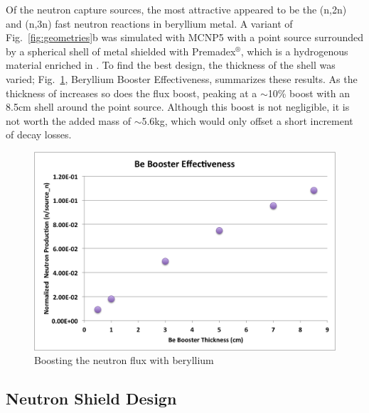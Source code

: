 \documentclass{mc2015}
\begin{document}
Of the neutron capture sources, the most attractive appeared to be the (n,2n) and (n,3n) fast neutron reactions in beryllium metal. A variant of Fig.\ \ref{fig:geometries}b was simulated with MCNP5 with a  point source surrounded by a spherical shell of  metal shielded with Premadex$^\circledR$, which is a hydrogenous material enriched in  \cite{prem}.
To find the best design, the thickness of the  shell was varied; Fig.\ \ref{fig:beboosters}, Beryllium Booster Effectiveness, summarizes these results. As the thickness of  increases so does the flux boost, peaking at a $\sim$10\% boost with an 8.5cm shell around the point source. Although this boost is not negligible, it is not worth the added mass of $\sim$5.6kg, which would only offset a short increment of  decay losses. 

\begin{figure}
  \centering
  \includegraphics[width=4.5in]{Be_boost.png}
  \caption{Boosting the neutron flux with beryllium}
  \label{fig:beboosters}
\end{figure}

\subsection{Neutron Shield Design}
\label{sec:shields}
\end{document}

